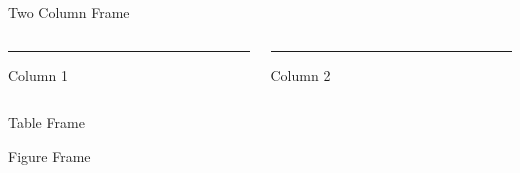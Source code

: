 \documentclass[notes,11pt, aspectratio=169]{beamer}
\begin{document}
\begin{frame}{Two Column Frame}
\begin{columns}[T] %
\begin{column}{.58\textwidth}
\color{red}\rule{\linewidth}{4pt}
Column 1
\end{column}%
\hfill%
\begin{column}{.38\textwidth}
\color{blue}\rule{\linewidth}{4pt}
Column 2
\end{column}%
\end{columns}
\end{frame}


\begin{frame}{Table Frame}
\end{frame}

\begin{frame}{Figure Frame}
\begin{center}
\end{center}
\end{frame}
\end{document}

